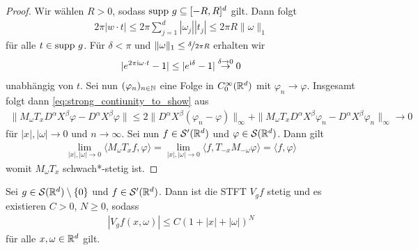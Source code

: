 \begin{proof}
	Wir wählen $ R > 0 $, sodass $ \mathrm{supp} \ g \subseteq [- R, R]^d $ gilt. Dann folgt
	\begin{align*}
	2\pi | w \cdot t | 
	\leq 
	2 \pi \sum \limits_{j =1 }^d | \omega_j| | t_j | \leq
	2 \pi R \|\omega \|_1
	\end{align*}
	für alle $ t \in \mathrm{supp} \ g $. Für $ \delta < \pi  $  und $ \| \omega \|_1 \leq \nicefrac{\delta}{2 \pi R} $ erhalten wir
	\begin{align*}
	| e^ {2 \pi \textrm{i} \omega \cdot t} - 1 |
	\leq 
	|e^{\textrm{i} \delta} - 1 | \stackrel{\delta \to 0}{\to} 0 
	\end{align*}
	unabhängig von $ t $.
	Sei nun $ (\varphi_n)_{n \in \mathbb{N}}  $ eine Folge in $ C_0^\infty(\mathbb{R}^d) $ mit 
	$ \varphi_n \to \varphi $.
	Insgesamt folgt dann \eqref{eq:strong_contiunity_to_show} aus
	\begin{align*}
	\| M_\omega T_x D^\alpha X^\beta \varphi - D^\alpha X^\beta \varphi \|
	\leq
	2 \|D^\alpha X^\beta (\varphi_n - \varphi) \|_\infty
	+
	\| M_\omega T_x  D^\alpha X^\beta \varphi_n - D^\alpha X^\beta \varphi_n \|_\infty
	\to 0 
	\end{align*}
	für $ |x|,|\omega| \to 0 $ und $ n \to \infty $.
	Sei nun $ f \in \mathcal{S}^\prime(\mathbb{R}^d) $ und $ \varphi \in \mathcal{S}(\mathbb{R}^d) $.
	Dann gilt
	\begin{align*}
	\lim \limits_{|x|, |\omega| \to 0}
	\langle M_\omega T_x f , \varphi \rangle
	=
	\lim \limits_{|x|, |\omega| \to 0}
	\langle f, T_{-x} M_{-\omega} \varphi \rangle 
	= 
	\langle f, \varphi \rangle
	\end{align*}
	womit $ M_\omega T_x $ schwach*-stetig ist.
	\end{proof}
	
	\begin{sz}\label{th:STFT_continous}
		Sei $ g \in \mathcal{S}(\mathbb{R}^d) \setminus \{0\} $ und $ f \in \mathcal{S}^\prime(\mathbb{R}^d) $.
		Dann ist die STFT $ V_g f $ stetig und es existieren $ C > 0  $, $ N \geq 0 $, sodass
		\begin{align}
		|V_g f(x,\omega) |
		\leq 
		C (1+|x| + |\omega|)^N
		\end{align}
		für alle $ x, \omega \in \mathbb{R}^d $ gilt.		
	\end{sz}
	
